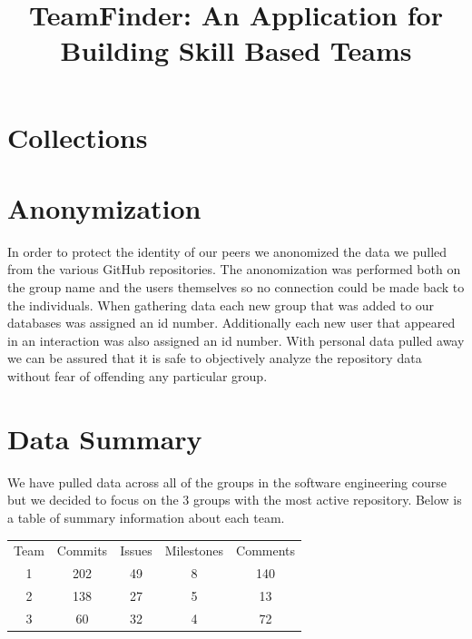 \documentclass[conference]{IEEEtran}
\begin{document}
\title{TeamFinder: An Application for Building Skill Based Teams}


\author{
}


\maketitle

\section{Collections}


\section{Anonymization}
In order to protect the identity of our peers we anonomized the data we pulled from the various GitHub repositories. The anonomization was performed both on the group name and the users themselves so no connection could be made back to the individuals. When gathering data each new group that was added to our databases was assigned an id number. Additionally each new user that appeared in an interaction was also assigned an id number. With personal data pulled away we can be assured that it is safe to objectively analyze the repository data without fear of offending any particular group. 

\section{Data Summary}
We have pulled data across all of the groups in the software engineering course but we decided to focus on the 3 groups with the most active repository. Below is a table of summary information about each team. 


\begin{tabular}{c|c|c|c|c}
    Team & Commits &  Issues & Milestones & Comments \\
    1 & 202 & 49 & 8 & 140 \\
    2 & 138 & 27 & 5 & 13 \\
    3 & 60 & 32 & 4 & 72 \\
\end{tabular}
\end{document}
